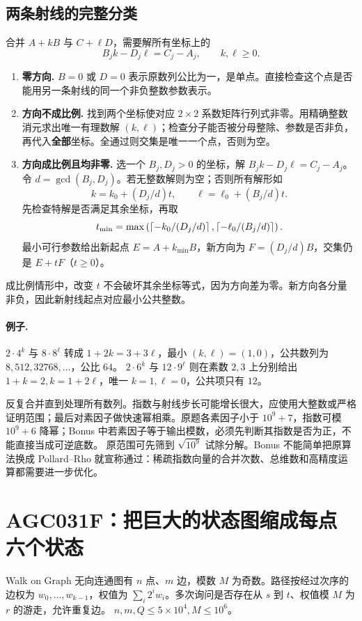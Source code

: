 \subsection{两条射线的完整分类}
合并 $A+kB$ 与 $C+\ell D$，需要解所有坐标上的
\[
 B_jk-D_j\ell=C_j-A_j,\qquad k,\ell\ge0.
\]
\begin{enumerate}
\item \textbf{零方向.} $B=0$ 或 $D=0$ 表示原数列公比为一，是单点。直接检查这个点是否能用另一条射线的同一个非负整数参数表示。
\item \textbf{方向不成比例.} 找到两个坐标使对应 $2\times2$ 系数矩阵行列式非零。用精确整数消元求出唯一有理数解 $(k,\ell)$；检查分子能否被分母整除、参数是否非负，再代入\textbf{全部}坐标。全通过则交集是唯一一个点，否则为空。
\item \textbf{方向成比例且均非零.} 选一个 $B_j,D_j>0$ 的坐标，解
$B_jk-D_j\ell=C_j-A_j$。令 $d=\gcd(B_j,D_j)$。若无整数解则为空；否则所有解形如
\[
 k=k_0+(D_j/d)t,\qquad\ell=\ell_0+(B_j/d)t.
\]
先检查特解是否满足其余坐标，再取
\[
 t_{\min}=\max\left(\left\lceil -k_0/(D_j/d)\right\rceil,\left\lceil -\ell_0/(B_j/d)\right\rceil\right).
\]
最小可行参数给出新起点 $E=A+k_{\min}B$，新方向为 $F=(D_j/d)B$，交集仍是 $E+tF$（$t\ge0$）。
\end{enumerate}
成比例情形中，改变 $t$ 不会破坏其余坐标等式，因为方向差为零。新方向各分量非负，因此新射线起点对应最小公共整数。

\paragraph{例子.} $2\cdot4^k$ 与 $8\cdot8^\ell$ 转成 $1+2k=3+3\ell$，最小 $(k,\ell)=(1,0)$，公共数列为 $8,512,32768,\ldots$，公比 $64$。
$2\cdot6^k$ 与 $12\cdot9^\ell$ 则在素数 $2,3$ 上分别给出 $1+k=2,k=1+2\ell$，唯一 $k=1,\ell=0$，公共项只有 $12$。

\cost 反复合并直到处理所有数列。指数与射线步长可能增长很大，应使用大整数或严格证明范围；最后对素因子做快速幂相乘。原题各素因子小于 $10^9+7$，指数可模 $10^9+6$ 降幂；Bonus 中若素因子等于输出模数，必须先判断其指数是否为正，不能直接当成可逆底数。
原范围可先筛到 $\sqrt{10^9}$ 试除分解。Bonus 不能简单把原算法换成 Pollard--Rho 就宣称通过：稀疏指数向量的合并次数、总维数和高精度运算都需要进一步优化。


\section{AGC031F：把巨大的状态图缩成每点六个状态}
\begin{problem}{Walk on Graph}
无向连通图有 $n$ 点、$m$ 边，模数 $M$ 为奇数。路径按经过次序的边权为 $w_0,\ldots,w_{k-1}$，权值为 $\sum_i2^iw_i$。多次询问是否存在从 $s$ 到 $t$、权值模 $M$ 为 $r$ 的游走，允许重复边。
$n,m,Q\le5\times10^4,M\le10^6$。
\end{problem}

